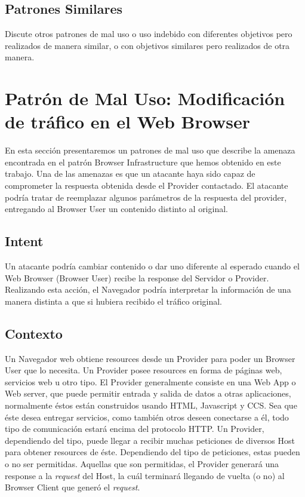 \subsection*{Patrones Similares}
Discute otros patrones de mal uso o uso indebido con diferentes objetivos pero realizados de manera similar, o con objetivos similares pero realizados de otra manera.

\section{Patrón de Mal Uso: Modificación de tráfico en el Web Browser}
En esta sección presentaremos un patrones de mal uso que describe la amenaza encontrada en el patrón Browser Infrastructure que hemos obtenido en este trabajo.
Una de las amenazas es que un atacante haya sido capaz de comprometer la respuesta obtenida desde el Provider contactado. El atacante podría tratar de reemplazar algunos parámetros de la respuesta del provider, entregando al Browser User un contenido distinto al original.

\subsection{Intent}
Un atacante podría cambiar contenido o dar uno diferente al esperado cuando el Web Browser (Browser User) recibe la response del Servidor o Provider. Realizando esta acción, el Navegador podría interpretar la información de una manera distinta a que si hubiera recibido el tráfico original.

\subsection{Contexto}
Un Navegador web obtiene resources desde un Provider para poder un Browser User que lo necesita. Un Provider posee resources en forma de páginas web, servicios web u otro tipo. El Provider generalmente consiste en una Web App o Web server, que puede permitir entrada y salida de datos a otras aplicaciones, normalmente éstos están construidos usando HTML, Javascript y CCS. Sea que éste desea entregar servicios, como también otros deseen conectarse a él, todo tipo de comunicación estará encima del protocolo HTTP. Un Provider, dependiendo del tipo, puede llegar a recibir muchas peticiones de diversos Host para obtener resources de éste. Dependiendo del tipo de peticiones, estas pueden o no ser permitidas. Aquellas que son permitidas, el Provider generará una response a la \textit{request} del Host, la cuál terminará llegando de vuelta (o no) al Browser Client que generó el \textit{request}.

